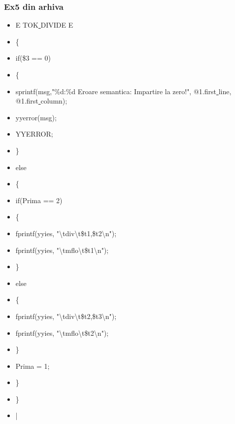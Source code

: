 \documentclass[pdf]{beamer}
\begin{document}
\begin{frame}[shrink=20]
\frametitle{Ex5 din arhiva}
\begin{itemize}
\item
E TOK\underline{ }DIVIDE E 
\item \quad
	\{ 
\item \quad \hspace{2mm}
	  if(\$3 == 0) 
\item \quad \hspace{2mm}
	  \{ 
\item \qquad \hspace{2mm}
	      sprintf(msg,"\%d:\%d Eroare semantica: Impartire la zero!", @1.first\underline{ }line, @1.first\underline{ }column);
\item \qquad \hspace{2mm}
	      yyerror(msg);
\item \qquad \hspace{2mm}
	      YYERROR;
\item \quad \hspace{2mm}
	  \} 
\item \quad \hspace{2mm}
	  else
\item \quad \hspace{2mm}
	  \{
\item \qquad \hspace{8mm}
		if(Prima == 2)
\item \qquad \hspace{8mm}
		\{
\item \qquad \hspace{12mm}
			fprintf(yyies, "\textbackslash{t}div\textbackslash{t}\$t1,\$t2\textbackslash{n}");
\item \qquad \hspace{12mm}
			fprintf(yyies, "\textbackslash{t}mflo\textbackslash{t}\$t1\textbackslash{n}");
\item \qquad \hspace{8mm}
		\}
\item \qquad \hspace{8mm}
		else
\item \qquad \hspace{8mm}
		\{
\item \qquad \hspace{12mm}
			fprintf(yyies, "\textbackslash{t}div\textbackslash{t}\$t2,\$t3\textbackslash{n}");
\item \qquad \hspace{12mm}
			fprintf(yyies, "\textbackslash{t}mflo\textbackslash{t}\$t2\textbackslash{n}");
\item \qquad \hspace{8mm}
		\}
\item \qquad \hspace{8mm}
		Prima = 1;
\item \qquad \hspace{2mm}
	  \}
\item \quad \hspace{2mm}
	\}
\item \quad
    | 
\end{itemize}
\end{frame}
\end{document}
